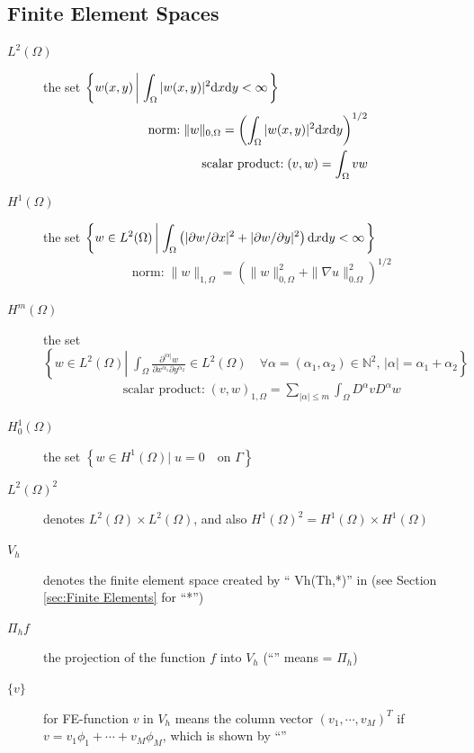 \documentclass[a4paper,twoside,12pt]{book}
\def\N{\mathbb{N}}
\def\d{\hbox{d}}
\def\p{\partial}
\def\refSec#1{Section \ref{sec:#1}}
\begin{document}
\subsection{Finite Element Spaces}
\begin{description}
\item[$L^2(\Omega)$] the set
$\displaystyle{
\left\{w(x,y)\left|\; \int_{\Omega}|w(x,y)|^2\d x\d y<\infty\right.\right\}
}$
\begin{eqnarray*}
&&\textrm{norm:}\; \| w\|_{0,\Omega}=\left(\int_{\Omega}|w(x,y)|^2\d x\d y\right)^{1/2}\\
&&\textrm{scalar product:}\; (v,w)=\int_{\Omega}vw
\end{eqnarray*}
\item[$H^1(\Omega)$] the set
$\displaystyle{
\left\{w\in L^2(\Omega)\left|\; \int_{\Omega}
\left(|\p w/\p x|^2+|\p w/\p y|^2\right)\d x\d y <\infty\right.\right\}
}$
\begin{eqnarray*}
&&\textrm{norm:}\; \| w\|_{1,\Omega}=\left(\| w\|_{0,\Omega}^2+\|\nabla u\|_{0.\Omega}^2\right)^{1/2}
\end{eqnarray*}
\item[$H^m(\Omega)$] the set
$\displaystyle{
\left\{w\in L^2(\Omega)\left|\; \int_{\Omega}
\frac{\p^{|\alpha|} w}{\p x^{\alpha_1}\p y^{\alpha_2}}\in L^2(\Omega)\quad
\forall \alpha=(\alpha_1,\alpha_2)\in \N^2,\, |\alpha|=\alpha_1+\alpha_2\right.
\right\}
}$
\begin{eqnarray*}
&&\textrm{scalar product:}\; (v,w)_{1,\Omega}=
\sum_{|\alpha|\le m}\int_{\Omega} D^{\alpha}v D^{\alpha}w
\end{eqnarray*}
\item[$H^1_0(\Omega)$]
the set $\left\{w\in H^1(\Omega)\left|\; u=0\quad \textrm{on }\Gamma\right.\right\}$
\item[$L^2(\Omega)^2$] denotes $L^2(\Omega)\times L^2(\Omega)$, and also
$H^1(\Omega)^2=H^1(\Omega)\times H^1(\Omega)$
  \item[$V_h$] denotes the finite element space created by
  `` Vh(Th,*)'' in \freefempp (see \refSec{Finite Elements} for ``*'')
  \item[$\Pi_h f$] the projection of the function $f$ into $V_h$
  (``'' means  = $\Pi_h$)  \item[$\{v\}$]
  for FE-function $v$ in $V_h$ means the column vector $(v_1,\cdots,v_M)^T$ if
  $v=v_1\phi_1+\cdots+v_M\phi_M$, which is shown by
  ``''
\end{description}
\end{document}
